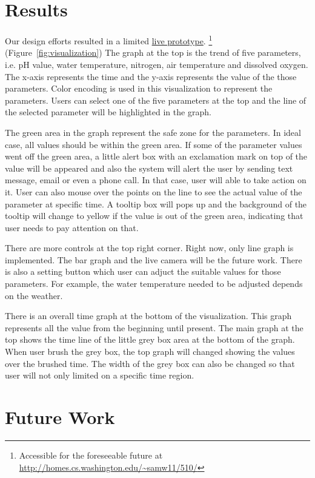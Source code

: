 \documentclass{sigchi}
\begin{document}
\section{Results}

Our design efforts resulted in a limited \href{http://homes.cs.washington.edu/~samw11/510/}{live prototype}.
\footnote{Accessible for the foreseeable future at \url{http://homes.cs.washington.edu/~samw11/510/}} (Figure~\ref{fig:visualization}) The graph at the top is the trend of five parameters, i.e. pH value, water temperature, nitrogen, air temperature and dissolved oxygen. The x-axis represents the time and the y-axis represents the value of the those parameters. Color encoding is used in this visualization to represent the parameters. Users can select one of the five parameters at the top and the line of the selected parameter will be highlighted in the graph. 

The green area in the graph represent the safe zone for the parameters. In ideal case, all values should be within the green area. If some of the parameter values went off the green area, a little alert box with an exclamation mark on top of the value will be appeared and also the system will alert the user by sending text message, email or even a phone call. In that case, user will able to take action on it. User can also mouse over the points on the line to see the actual value of the parameter at specific time. A tooltip box will pops up and the background of the tooltip will change to yellow if the value is out of the green area, indicating that user needs to pay attention on that.

There are more controls at the top right corner. Right now, only line graph is implemented. The bar graph and the live camera will be the future work. There is also a setting button which user can adjuct the suitable values for those parameters. For example, the water temperature needed to be adjusted depends on the weather. 

There is an overall time graph at the bottom of the visualization. This graph represents all the value from the beginning until present. The main graph at the top shows the time line of the little grey box area at the bottom of the graph. When user brush the grey box, the top graph will changed showing the values over the brushed time. The width of the grey box can also be changed so that user will not only limited on a specific time region. 

\section{Future Work}
\end{document}
